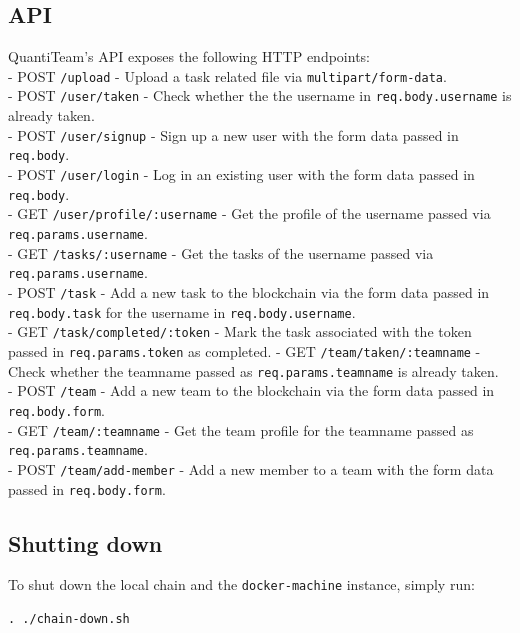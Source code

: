 \documentclass[12pt]{report}
\begin{document}
\subsection{API}\label{api}

QuantiTeam's API exposes the following HTTP endpoints:\\
- POST
\texttt{/upload} - Upload a task related file via
\texttt{multipart/form-data}.\\
- POST \texttt{/user/taken} - Check whether the the username in
\texttt{req.body.username} is already taken.\\
- POST \texttt{/user/signup} - Sign up a new user with the form data
passed in \texttt{req.body}.\\
- POST \texttt{/user/login} - Log in an existing user with the form data
passed in \texttt{req.body}.\\
- GET \texttt{/user/profile/:username} - Get the profile of the username
passed via \texttt{req.params.username}.\\
- GET \texttt{/tasks/:username} - Get the tasks of the username passed
via \texttt{req.params.username}.\\
- POST \texttt{/task} - Add a new task to the blockchain via the form
data passed in \texttt{req.body.task} for the username in
\texttt{req.body.username}.\\
- GET \texttt{/task/completed/:token} - Mark the task associated with
the token passed in \texttt{req.params.token} as completed. - GET
\texttt{/team/taken/:teamname} - Check whether the teamname passed as
\texttt{req.params.teamname} is already taken.\\
- POST \texttt{/team} - Add a new team to the blockchain via the form
data passed in \texttt{req.body.form}.\\
- GET \texttt{/team/:teamname} - Get the team profile for the teamname
passed as \texttt{req.params.teamname}.\\
- POST \texttt{/team/add-member} - Add a new member to a team with the
form data passed in \texttt{req.body.form}.

\subsection{Shutting down}\label{shutting-down}

To shut down the local chain and the \texttt{docker-machine} instance,
simply run:

\begin{verbatim}
. ./chain-down.sh
\end{verbatim}
\end{document}
